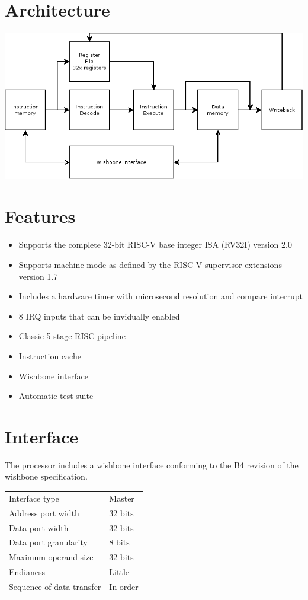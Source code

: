 \documentclass[10pt,a4paper]{article}
\begin{document}
\begin{minipage}[t]{0.48\textwidth}

\section{Architecture}
\includegraphics[width=\textwidth]{diagram.png}

\section{Features}

\begin{itemize}
\item Supports the complete 32-bit RISC-V base integer ISA (RV32I) version 2.0
\item Supports machine mode as defined by the RISC-V supervisor extensions version 1.7
\item Includes a hardware timer with microsecond resolution and compare interrupt
\item 8 IRQ inputs that can be invidually enabled
\item Classic 5-stage RISC pipeline
\item Instruction cache
\item Wishbone interface
\item Automatic test suite
\end{itemize}

\section{Interface}

The processor includes a wishbone interface conforming to the B4 revision of the
wishbone specification.\\

\begin{tabularx}{\textwidth}{|l|X|}
\hline
Interface type & Master \\
Address port width & 32 bits \\
Data port width & 32 bits \\
Data port granularity & 8 bits \\
Maximum operand size & 32 bits \\
Endianess & Little \\
Sequence of data transfer & In-order \\
\hline
\end{tabularx}


\end{minipage}
\end{document}

